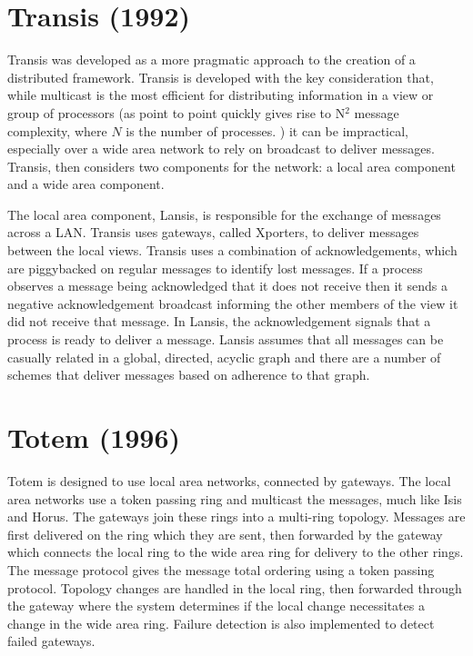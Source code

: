 \section{Transis (1992)}

Transis \cite{TRANSISTOOLKIT} was developed as a more pragmatic approach to the creation of a distributed framework. Transis is developed with the key consideration that, while multicast is the most efficient for distributing information in a view or group of processors (as point to point quickly gives rise to N$^{2}$ message complexity, where $N$ is the number of processes. ) it can be impractical, especially over a wide area network to rely on broadcast to deliver messages. Transis, then considers two components for the network: a local area component and a wide area component.

The local area component, Lansis, is responsible for the exchange of messages across a LAN. Transis uses gateways, called Xporters, to deliver messages between the local views. Transis uses a combination of acknowledgements, which are piggybacked on regular messages to identify lost messages. If a process observes a message being acknowledged that it does not receive then it sends a negative acknowledgement broadcast informing the other members of the view it did not receive that message. In Lansis, the acknowledgement signals that a process is ready to deliver a message. Lansis assumes that all messages can be casually related in a global, directed, acyclic graph and there are a number of schemes that deliver messages based on adherence to that graph.

 

\section{Totem (1996)}

Totem\cite{TOTEMTOOLKIT} is designed to use local area networks, connected by gateways. The local area networks use a token passing ring and multicast the messages, much like Isis and Horus. The gateways join these rings into a multi-ring topology. Messages are first delivered on the ring which they are sent, then forwarded by the gateway which connects the local ring to the wide area ring for delivery to the other rings. The message protocol gives the message total ordering using a token passing protocol. Topology changes are handled in the local ring, then forwarded through the gateway where the system determines if the local change necessitates a change in the wide area ring. Failure detection is also implemented to detect failed gateways.
                                             

